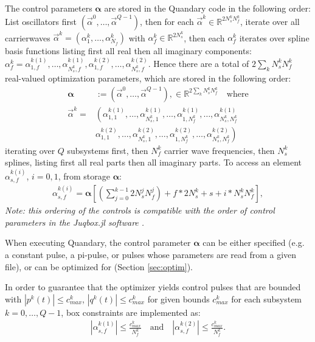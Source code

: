 \documentclass[11pt]{article}
\newcommand{\R}{\mathds{R}}
\newcommand{\bfa}{\boldsymbol{\alpha}}
\newcommand{\bs}[1]{{\boldsymbol{#1}}}
\begin{document}
The control parameters $\bs{\alpha}$ are stored in the Quandary code in the following order: List oscillators first $(\vec{\alpha}^0, \dots, \vec{\alpha}^{Q-1})$, then for each $\vec{\alpha}^k \in
\R^{2 N_s^k N_f^k}$, iterate over all carrierwaves $\vec{\alpha}^k =
(\alpha^k_1,\dots, \alpha^k_{N_f})$ with $\alpha^k_f \in \R^{2 N_s^k}$, then each
$\alpha^k_f$ iterates over spline basis functions listing first all real then all imaginary 
components: $\alpha^k_f = \alpha^{k(1)}_{1,f}, \dots, \alpha^{k(1)}_{N_s^k,f}, \alpha^{k(2)}_{1,f}, \dots, \alpha^{k(2)}_{N_s^k,f}$. Hence there are a total of $2\sum_k N_s^k N_f^k$ real-valued optimization parameters, which are stored in the following order:
  \begin{align}
    \boldsymbol{\alpha} &:= \left( \vec{\alpha}^0, \dots, \vec{\alpha}^{Q-1} \right), \in
    \mathds{R}^{2\sum_k N_s^k N_f^k} \quad \text{where}\\
    \vec{\alpha}^k = &\left( \alpha_{1,1}^{k(1)},\dots, \alpha_{N_s^k,1}^{k(1)}, \dots, \alpha_{1,N_f^k}^{k(1)}, \dots, \alpha_{N_s^k,N_f^k}^{k(1)} \right.\\
                   &  \left. \alpha_{1,1}^{k(2)},\dots, \alpha_{N_s^k,1}^{k(2)}, \dots, \alpha_{1,N_f^k}^{k(2)}, \dots, \alpha_{N_s^k,N_f^k}^{k(2)} \right)
  \end{align}
  iterating over $Q$ subsystems first, then $N_f^k$ carrier wave frequencies, then $N_s^k$ splines, listing first all real parts then all imaginary parts. To access an element $\alpha_{s,f}^{k(i)}$, $i=0,1$, from storage $\bfa$:
  \begin{align}
    \alpha_{s,f}^{k(i)} = \bfa \left[ \left(\sum_{j=0}^{k-1} 2 N_s^j N_f^j\right) + f*2 N_s^k + s + i*N_s^k N_f^k \right],
  \end{align}
  \textit{Note: this ordering of the controls is compatible with the order of control parameters in the Juqbox.jl software \cite{petersson2021optimal}.}

  When executing Quandary, the control parameter $\boldsymbol{\alpha}$ can be either specified (e.g. a constant pulse, a pi-pulse, or 
  pulses whose parameters are read from a given file), or can be optimized for (Section \ref{sec:optim}). 
  
  In order to guarantee that the optimizer yields control pulses that are
  bounded with $|p^k(t)| \leq c^k_{max}$, $|q^k(t)| \leq c^k_{max}$ for given bounds $c^k_{max}$ for each  
  subsystem $k=0,\dots, Q-1$, box constraints are implemented as:
   \begin{align}
     | \alpha_{s,f}^{k(1)}| \leq \frac{c^k_{max}}{N_f^k} \quad \text{and} \quad |
     \alpha_{s,f}^{k(2)} | \leq \frac{c^k_{max}}{N_f^k}.
   \end{align}
\end{document}
